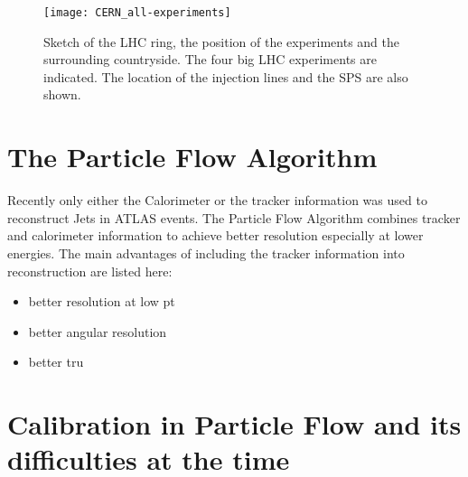 \begin{figure}[htbp]
  \centering
  \texttt{[image: CERN\_all-experiments]}
  \caption[Sketch of the LHC ring, the position of the experiments and
  the surrounding countryside.]{Sketch of the LHC ring, the position
    of the experiments and the surrounding countryside. The four big
    LHC experiments are indicated. The location of the injection lines
    and the SPS are also shown.}
  \label{fig:LHC}
\end{figure}

\section{The Particle Flow Algorithm}

Recently only either the Calorimeter or the tracker information was used to reconstruct Jets in ATLAS events. The Particle Flow Algorithm combines tracker and calorimeter information to achieve better resolution especially at lower energies. The main advantages of including the tracker information into reconstruction are listed here:

\begin{itemize}
\item better resolution at low pt
\item better angular resolution
\item better tru
\end{itemize}


\section{Calibration in Particle Flow and its difficulties at the time}